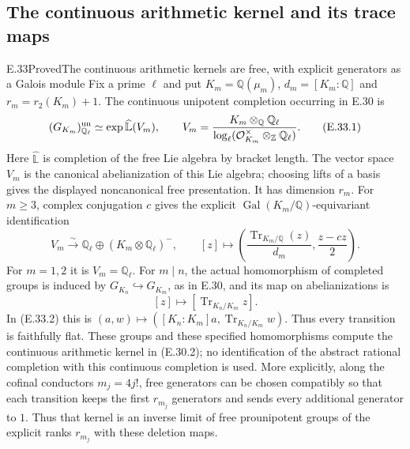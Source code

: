 \subsection{The continuous arithmetic kernel and its trace maps}

\begin{statement}{E.33}{Proved}{The continuous arithmetic kernels are free, with explicit generators as a Galois module}
Fix a prime $\ell$ and put $K_m=\mathbb Q(\mu_m)$,
$d_m=[K_m:\mathbb Q]$ and $r_m=r_2(K_m)+1$.
The continuous unipotent completion occurring in E.30 is
\[
 (G_{K_m})^{\rm un}_{\mathbb Q_\ell}
 \simeq \exp\widehat{\mathbb L}(V_m),\qquad
 V_m=\frac{K_m\otimes_{\mathbb Q}\mathbb Q_\ell}
 {\log_\ell(\mathcal O_{K_m}^{\times}\otimes_{\mathbb Z}\mathbb Q_\ell)}.
                                                        \tag{E.33.1}
\]
Here $\widehat{\mathbb L}$ is completion of the free Lie algebra by
bracket length. The vector space $V_m$ is the canonical abelianization
of this Lie algebra; choosing lifts of a basis gives the displayed
noncanonical free presentation. It has dimension $r_m$.
For $m\geq3$, complex conjugation $c$ gives the explicit
$\operatorname{Gal}(K_m/\mathbb Q)$-equivariant identification
\[
 V_m\xrightarrow{\sim}\mathbb Q_\ell\oplus
        (K_m\otimes\mathbb Q_\ell)^-,\qquad
 [z]\longmapsto
 \left(\frac{\operatorname{Tr}_{K_m/\mathbb Q}(z)}{d_m},
                         \frac{z-cz}{2}\right).           \tag{E.33.2}
\]
For $m=1,2$ it is $V_m=\mathbb Q_\ell$.
For $m\mid n$, the actual homomorphism of completed groups is induced
by $G_{K_n}\hookrightarrow G_{K_m}$, as in E.30, and its map on
abelianizations is
\[
 [z]\longmapsto[\operatorname{Tr}_{K_n/K_m}z].             \tag{E.33.3}
\]
In (E.33.2) this is $(a,w)\mapsto([K_n:K_m]a,
\operatorname{Tr}_{K_n/K_m}w)$. Thus every transition is faithfully
flat. These groups and these specified homomorphisms compute the
continuous arithmetic kernel in (E.30.2); no identification of
the abstract rational completion with this continuous completion is
used.
More explicitly, along the cofinal conductors $m_j=4j!$, free
generators can be chosen compatibly so that each transition keeps
the first $r_{m_j}$ generators and sends every additional generator
to $1$. Thus that kernel is an inverse limit of free prounipotent
groups of the explicit ranks $r_{m_j}$ with these deletion maps.
\end{statement}
